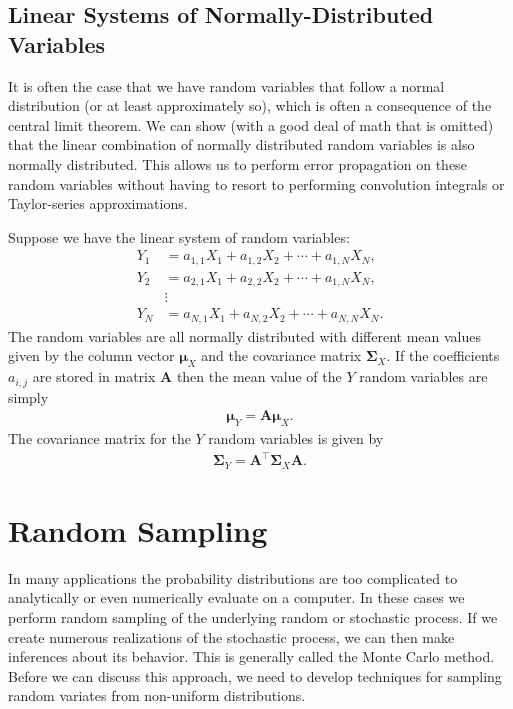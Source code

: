 \subsection{Linear Systems of Normally-Distributed Variables}

It is often the case that we have random variables that follow a normal distribution (or at least approximately so), which is often a consequence of the central limit theorem. We can show (with a good deal of math that is omitted) that the linear combination of normally distributed random variables is also normally distributed. This allows us to perform error propagation on these random variables without having to resort to performing convolution integrals or Taylor-series approximations.

Suppose we have the linear system of random variables:
\begin{align}
  Y_1 &= a_{1,1} X_1 + a_{1,2} X_2 + \cdots + a_{1,N} X_N, \nonumber \\
  Y_2 &= a_{2,1} X_1 + a_{2,2} X_2 + \cdots + a_{1,N} X_N, \nonumber \\
  &\vdots \nonumber \\
  Y_N &= a_{N,1} X_1 + a_{N,2} X_2 + \cdots + a_{N,N} X_N.
\end{align}
The random variables are all normally distributed with different mean values given by the column vector $\boldsymbol\mu_X$ and the covariance matrix $\boldsymbol\Sigma_X$. If the coefficients $a_{i,j}$ are stored in matrix $\mathbf{A}$ then the mean value of the $Y$ random variables are simply
\begin{align}
  \boldsymbol\mu_Y = \mathbf{A} \boldsymbol\mu_X .
\end{align}
The covariance matrix for the $Y$ random variables is given by
\begin{align}
  \boldsymbol\Sigma_Y = \mathbf{A}^\top \boldsymbol\Sigma_X \mathbf{A} .
\end{align}




\section{Random Sampling}

In many applications the probability distributions are too complicated to analytically or even numerically evaluate on a computer. In these cases we perform random sampling of the underlying random or stochastic process. If we create numerous realizations of the stochastic process, we can then make inferences about its behavior. This is generally called the Monte Carlo method. Before we can discuss this approach, we need to develop techniques for sampling random variates from non-uniform distributions.

